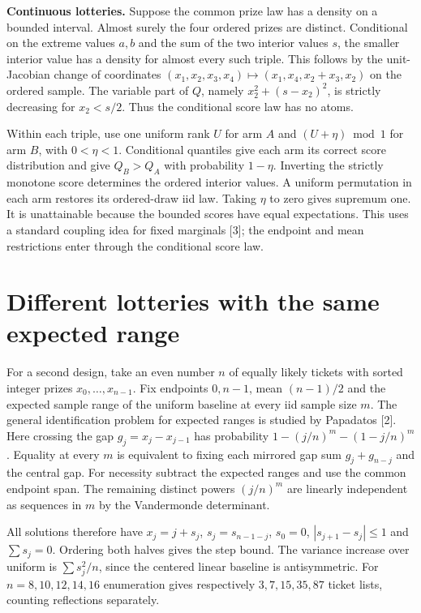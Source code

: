 \documentclass[10pt]{article}
\begin{document}
\textbf{Continuous lotteries.} Suppose the common prize law has a density on a bounded interval. Almost surely the four ordered prizes are distinct. Conditional on the extreme values $a,b$ and the sum of the two interior values $s$, the smaller interior value has a density for almost every such triple. This follows by the unit-Jacobian change of coordinates $(x_1,x_2,x_3,x_4)\mapsto(x_1,x_4,x_2+x_3,x_2)$ on the ordered sample. The variable part of $Q$, namely $x_2^2+(s-x_2)^2$, is strictly decreasing for $x_2<s/2$. Thus the conditional score law has no atoms.

Within each triple, use one uniform rank $U$ for arm $A$ and $(U+\eta)\bmod 1$ for arm $B$, with $0<\eta<1$. Conditional quantiles give each arm its correct score distribution and give $Q_B>Q_A$ with probability $1-\eta$. Inverting the strictly monotone score determines the ordered interior values. A uniform permutation in each arm restores its ordered-draw iid law. Taking $\eta$ to zero gives supremum one. It is unattainable because the bounded scores have equal expectations. This uses a standard coupling idea for fixed marginals [3]; the endpoint and mean restrictions enter through the conditional score law.
\newpage

\section*{Different lotteries with the same expected range}
For a second design, take an even number $n$ of equally likely tickets with sorted integer prizes $x_0,\ldots,x_{n-1}$. Fix endpoints $0,n-1$, mean $(n-1)/2$ and the expected sample range of the uniform baseline at every iid sample size $m$. The general identification problem for expected ranges is studied by Papadatos [2]. Here crossing the gap $g_j=x_j-x_{j-1}$ has probability $1-(j/n)^m-(1-j/n)^m$. Equality at every $m$ is equivalent to fixing each mirrored gap sum $g_j+g_{n-j}$ and the central gap. For necessity subtract the expected ranges and use the common endpoint span. The remaining distinct powers $(j/n)^m$ are linearly independent as sequences in $m$ by the Vandermonde determinant.

All solutions therefore have $x_j=j+s_j$, $s_j=s_{n-1-j}$, $s_0=0$, $|s_{j+1}-s_j|\le1$ and $\sum s_j=0$. Ordering both halves gives the step bound. The variance increase over uniform is $\sum s_j^2/n$, since the centered linear baseline is antisymmetric. For $n=8,10,12,14,16$ enumeration gives respectively $3,7,15,35,87$ ticket lists, counting reflections separately.
\end{document}
